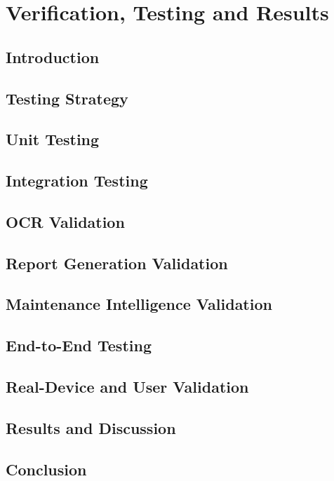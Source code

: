 \chapter{Verification, Testing and Results}

\section{Introduction}

\section{Testing Strategy}

\section{Unit Testing}

\section{Integration Testing}

\section{OCR Validation}

\section{Report Generation Validation}

\section{Maintenance Intelligence Validation}

\section{End-to-End Testing}

\section{Real-Device and User Validation}

\section{Results and Discussion}

\section{Conclusion}

